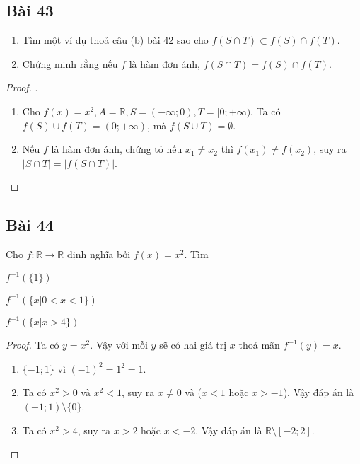 \subsection*{Bài 43}
\begin{enumerate}[label=\alph*)]
    \item Tìm một ví dụ thoả câu (b) bài 42 sao cho $f(S\cap T)\subset f(S)\cap f(T)$.
    \item Chứng minh rằng nếu $f$ là hàm đơn ánh, $f(S\cap T)=f(S)\cap f(T)$.
\end{enumerate}
\begin{proof}.
    \begin{enumerate}[label=\alph*)]
        \item Cho $f(x)=x^2,A=\mathbb{R},S=(-\infty;0),T=[0;+\infty)$. Ta có $f(S)\cup f(T)=(0;+\infty)$, mà $f(S\cup T)=\emptyset$.
        \item Nếu $f$ là hàm đơn ánh, chứng tỏ nếu $x_1\neq x_2$ thì $f(x_1)\neq f(x_2)$, suy ra $|S\cap T|=|f(S\cap T)|$.
    \end{enumerate}
\end{proof}
\subsection*{Bài 44}
Cho $f:\mathbb{R}\to\mathbb{R}$ định nghĩa bởi $f(x)=x^2$. Tìm
\begin{enumerate}[label=\alph*)]
    \begin{multicols}{2}
        \item $f^{-1}(\{1\})$
        \item $f^{-1}(\{x|0<x<1\})$
        \item $f^{-1}(\{x|x>4\})$
    \end{multicols}
\end{enumerate}
\begin{proof}
    Ta có $y=x^2$. Vậy với mỗi $y$ sẽ có hai giá trị $x$ thoả mãn $f^{-1}(y)=x$.
    \begin{enumerate}[label=\alph*)]
        \item $\{-1;1\}$ vì $(-1)^2=1^2=1$.
        \item Ta có $x^2>0$ và $x^2<1$, suy ra $x\neq 0$ và ($x<1$ hoặc $x>-1$). Vậy đáp án là $(-1;1)\setminus\{0\}$.
        \item Ta có $x^2>4$, suy ra $x>2$ hoặc $x<-2$. Vậy đáp án là $\mathbb{R}\setminus[-2;2]$.
    \end{enumerate}
\end{proof}
